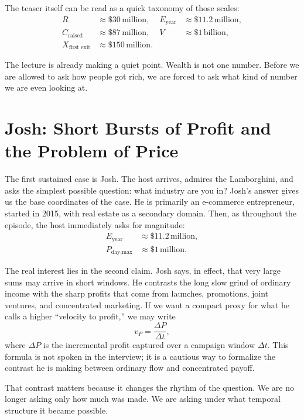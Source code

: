 The teaser itself can be read as a quick taxonomy of those scales:
\begin{align}
R &\approx \$30\,\text{million}, &
E_{\text{year}} &\approx \$11.2\,\text{million}, \\
C_{\text{raised}} &\approx \$87\,\text{million}, &
V &\approx \$1\,\text{billion}, \\
X_{\text{first exit}} &\approx \$150\,\text{million}. &&
\end{align}

The lecture is already making a quiet point. Wealth is not one number. Before we are allowed to ask how people got rich, we are forced to ask what kind of number we are even looking at.

\section{Josh: Short Bursts of Profit and the Problem of Price}

The first sustained case is Josh. The host arrives, admires the Lamborghini, and asks the simplest possible question: what industry are you in? Josh's answer gives us the base coordinates of the case. He is primarily an e-commerce entrepreneur, started in 2015, with real estate as a secondary domain. Then, as throughout the episode, the host immediately asks for magnitude:
\begin{align}
E_{\text{year}} &\approx \$11.2\,\text{million},\\
P_{\text{day,max}} &\approx \$1\,\text{million}.
\end{align}

The real interest lies in the second claim. Josh says, in effect, that very large sums may arrive in short windows. He contrasts the long slow grind of ordinary income with the sharp profits that come from launches, promotions, joint ventures, and concentrated marketing. If we want a compact proxy for what he calls a higher ``velocity to profit,'' we may write
\begin{equation}
v_P=\frac{\Delta P}{\Delta t},
\end{equation}
where \(\Delta P\) is the incremental profit captured over a campaign window \(\Delta t\). This formula is not spoken in the interview; it is a cautious way to formalize the contrast he is making between ordinary flow and concentrated payoff.

That contrast matters because it changes the rhythm of the question. We are no longer asking only how much was made. We are asking under what temporal structure it became possible.

